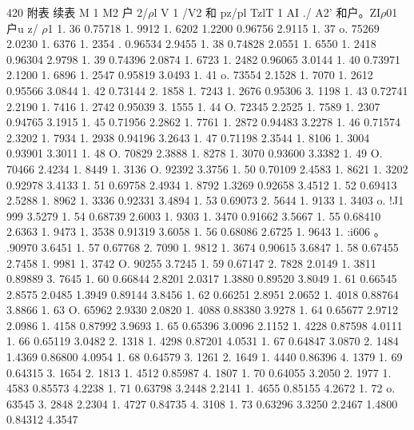 420 附表 续表 M 1 M2 户 2/$\rho$l V 1 /V2 和 pz/pl TzlT 1 AI ./ A2' 和户。ZI$\rho$01 户u z/ $\rho$1 1. 36 0.75718 1. 9912 1. 6202 1.2200 0.96756 2.9115 1. 37 o. 75269 2.0230 1. 6376 1. 2354 . 0.96534 2.9455 1. 38 0.74828 2.0551 1. 6550 1. 2418 0.96304 2.9798 1. 39 0.74396 2.0874 1. 6723 1. 2482 0.96065 3.0144 1. 40 0.73971 2.1200 1. 6896 1. 2547 0.95819 3.0493 1. 41 o. 73554 2.1528 1. 7070 1. 2612 0.95566 3.0844 1. 42 0.73144 2. 1858 1. 7243 1. 2676 0.95306 3. 1198 1. 43 0.72741 2.2190 1. 7416 1. 2742 0.95039 3. 1555 1. 44 O. 72345 2.2525 1. 7589 1. 2307 0.94765 3.1915 1. 45 0.71956 2.2862 1. 7761 1. 2872 0.94483 3.2278 1. 46 0.71574 2.3202 1. 7934 1. 2938 0.94196 3.2643 1. 47 0.71198 2.3544 1. 8106 1. 3004 0.93901 3.3011 1. 48 O. 70829 2.3888 1. 8278 1. 3070 0.93600 3.3382 1. 49 O. 70466 2.4234 1. 8449 1. 3136 O. 92392 3.3756 1. 50 0.70109 2.4583 1. 8621 1. 3202 0.92978 3.4133 1. 51 0.69758 2.4934 1. 8792 1.3269 0.92658 3.4512 1. 52 0.69413 2.5288 1. 8962 1. 3336 0.92331 3.4894 1. 53 0.69073 2. 5644 1. 9133 1. 3403 o. !J1 999 3.5279 1. 54 0.68739 2.6003 1. 9303 1. 3470 0.91662 3.5667 1. 55 0.68410 2.6363 1. 9473 1. 3538 0.91319 3.6058 1. 56 0.68086 2.6725 1. 9643 1. :i606 。 .90970 3.6451 1. 57 0.67768 2. 7090 1. 9812 1. 3674 0.90615 3.6847 1. 58 0.67455 2.7458 1. 9981 1. 3742 O. 90255 3.7245 1. 59 0.67147 2. 7828 2.0149 1. 3811 0.89889 3. 7645 1. 60 0.66844 2.8201 2.0317 1.3880 0.89520 3.8049 1. 61 0.66545 2.8575 2.0485 1.3949 0.89144 3.8456 1. 62 0.66251 2.8951 2.0652 1. 4018 0.88764 3.8866 1. 63 O. 65962 2.9330 2.0820 1. 4088 0.88380 3.9278 1. 64 0.65677 2.9712 2.0986 1. 4158 0.87992 3.9693 1. 65 0.65396 3.0096 2.1152 1. 4228 0.87598 4.0111 1. 66 0.65119 3.0482 2. 1318 1. 4298 0.87201 4.0531 1. 67 0.64847 3.0870 2. 1484 1.4369 0.86800 4.0954 1. 68 0.64579 3. 1261 2. 1649 1. 4440 0.86396 4. 1379 1. 69 0.64315 3. 1654 2. 1813 1. 4512 0.85987 4. 1807 1. 70 0.64055 3.2050 2. 1977 1. 4583 0.85573 4.2238 1. 71 0.63798 3.2448 2.2141 1. 4655 0.85155 4.2672 1. 72 o. 63545 3. 2848 2.2304 1. 4727 0.84735 4. 3108 1. 73 0.63296 3.3250 2.2467 1.4800 0.84312 4.3547

